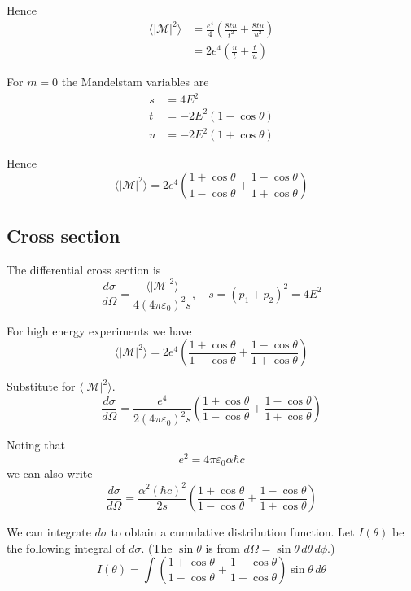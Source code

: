 \documentclass[12pt]{article}
\begin{document}
Hence
\begin{align*}
\langle|\mathcal{M}|^2\rangle
&=
\frac{e^4}{4}
\left(
\frac{8tu}{t^2}
+\frac{8tu}{u^2}
\right)
\\
&=
2e^4
\left(
\frac{u}{t}
+\frac{t}{u}
\right)
\end{align*}

For $m=0$ the Mandelstam variables are
\begin{align*}
s&=4E^2\\
t&=-2E^2(1-\cos\theta)
\\
u&=-2E^2(1+\cos\theta)
\end{align*}

Hence
\begin{equation*}
\langle|\mathcal{M}|^2\rangle
=2e^4\left(
\frac{1+\cos\theta}{1-\cos\theta}+
\frac{1-\cos\theta}{1+\cos\theta}
\right)
\end{equation*}

\subsection*{Cross section}
The differential cross section is
\begin{equation*}
\frac{d\sigma}{d\Omega}=\frac{\langle|\mathcal{M}|^2\rangle}{4(4\pi\varepsilon_0)^2s},
\quad s=(p_1+p_2)^2=4E^2
\end{equation*}

For high energy experiments we have
\begin{equation*}
\langle|\mathcal{M}|^2\rangle=2e^4\left(
\frac{1+\cos\theta}{1-\cos\theta}+
\frac{1-\cos\theta}{1+\cos\theta}
\right)
\end{equation*}

Substitute for $\langle|\mathcal{M}|^2\rangle$.
\begin{equation*}
\frac{d\sigma}{d\Omega}
=\frac{e^4}{2(4\pi\varepsilon_0)^2s}\left(\frac{1+\cos\theta}{1-\cos\theta}+\frac{1-\cos\theta}{1+\cos\theta}\right)
\end{equation*}

Noting that
\begin{equation*}
e^2=4\pi\varepsilon_0\alpha\hbar c
\end{equation*}
we can also write
\begin{equation*}
\frac{d\sigma}{d\Omega}
=
\frac{\alpha^2(\hbar c)^2}{2s}
\left(
\frac{1+\cos\theta}{1-\cos\theta}+
\frac{1-\cos\theta}{1+\cos\theta}
\right)
\end{equation*}

We can integrate $d\sigma$ to obtain a cumulative distribution function.
Let $I(\theta)$ be the following integral of $d\sigma$.
(The $\sin\theta$ is from $d\Omega=\sin\theta\,d\theta\,d\phi$.)
\begin{equation*}
I(\theta)
=\int
\left(\frac{1+\cos\theta}{1-\cos\theta}+\frac{1-\cos\theta}{1+\cos\theta}\right)
\sin\theta\,d\theta
\end{equation*}
\end{document}
